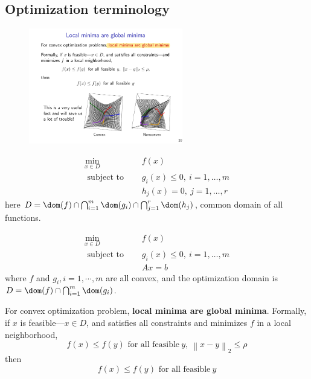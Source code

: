 \documentclass[a4paper]{article}
\begin{document}
{\subsection{Optimization terminology}
\begin{figure}[htbp] 
  \centering 
  \includegraphics[width=0.6\textwidth]{img/convex_vs_nonconvex.pdf} 
\end{figure}

\begin{defi} 
    \begin{align*}
        \min _{x \in D} & \quad f(x) \\
        \text { subject to } &\quad g_{i}(x) \leq 0, \ i=1, \ldots, m \\
        &\quad h_{j}(x)=0, \ j=1, \ldots, r
    \end{align*}
  here $D = \dom (f) \cap \bigcap_{i=1}^{m} \dom (g_{i}) \cap \bigcap_{j=1}^{r} \dom(h_j)$, common domain of all functions.
\end{defi}

\begin{defi} 
  \begin{align*}
      \min _{x \in D} & \quad f(x)  \\
      \text { subject to } &\quad g_{i}(x)\leq 0, \ i=1, \ldots, m \\
      & \quad  Ax = b 
  \end{align*}
  where $f$ and $g_i, i= 1,\cdots,m $ are all convex, and the optimization domain is $D = \dom (f) \cap \bigcap_{i=1}^{m} \dom (g_{i})$.
\end{defi}


For convex optimization problem, \textbf{local minima are global minima}.
Formally, if $x$ is feasible---$x \in D$, and satisfies all constraints and minimizes $f$ in a local neighborhood,
\[
    f(x) \leq f(y) \text{\ for \ all \ feasible} \ y, \ \left\lVert x -y \right\rVert_2 \leq \rho
\]
then
\[
    f(x) \leq f(y) \text{\ for \ all \ feasible} \ y
\]


}
\end{document}
